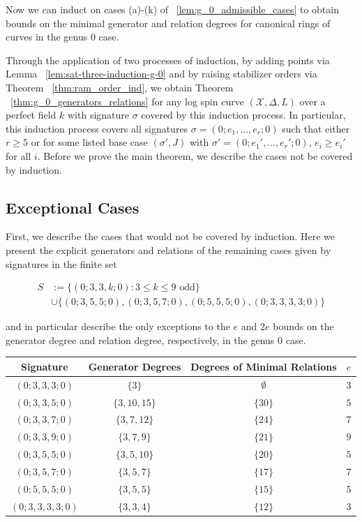 \documentclass{amsart}
\theoremstyle{plain}
\theoremstyle{definition}
\theoremstyle{remark}
\numberwithin{equation}{section}
\newcommand\ssec{\subsection}
\newcommand \sx{\mathscr X}
\begin{document}
Now we can induct on cases (a)-(k) of ~\ref{lem:g_0_admissible_cases}
to obtain bounds on the minimal generator and relation degrees for
canonical rings of curves in the genus 0 case.

Through the application of two processes of induction, by adding 
points via Lemma ~\ref{lem:sat-three-induction-g-0} and by raising
stabilizer orders via Theorem ~\ref{thm:ram_order_ind},
we obtain Theorem ~\ref{thm:g_0_generators_relations} for any
log spin curve $(\sx, \Delta, L)$ over a perfect field $k$ with
signature $\sigma$ covered by this induction process.
In particular, this induction process covers all signatures $\sigma
= (0; e_1, \ldots, e_r; 0)$ such that either $r \geq 5$ or
for some listed base case $(\sigma', J)$ with $\sigma' = (0; e_1',
\ldots, e_r'; 0)$, $e_i \geq e_i'$ for all $i$.
Before we prove the main theorem, we describe the cases not be
covered by induction.

\ssec{Exceptional Cases}
\label{ssec:g-0-exceptional}
First, we describe the cases that would not be covered by induction.
Here we present the explicit generators and relations of the remaining
cases given by signatures in the finite set

\begin{align*}
	S &:= \{(0; 3, 3, k; 0) : 3 \leq k \leq 9 \text{ odd}\} \\
		&\cup \{(0; 3, 5, 5; 0) ,(0; 3, 5, 7; 0), (0; 5, 5, 5; 0), (0; 3, 3, 3, 3; 0)\}
\end{align*}

\noindent
and in particular describe the only exceptions to the $e$ and $2e$
bounds on the generator degree and relation degree, respectively,
in the genus 0 case.

\begin{longtable}
	{| c || c | c | c |}
	\hline
	Signature & Generator Degrees & Degrees of Minimal Relations & $e$ \\
	\hline
	\hline

	$(0; 3, 3, 3; 0)$ & $\{3\}$ & $\emptyset$ & $3$ \\	\hline

	$(0; 3, 3, 5; 0)$ & $\{3, 10, 15\}$ & $\{30\}$ & $5$ \\	\hline
	
	$(0; 3, 3, 7; 0)$ & $\{3, 7, 12\}$ & $\{24\}$ & $7$ \\	\hline
	
	$(0; 3, 3, 9; 0)$ & $\{3, 7, 9\}$ & $\{21\}$ & $9$ \\	\hline
	
	$(0; 3, 5, 5; 0)$ & $\{3, 5, 10\}$ & $\{20\}$ & $5$ \\	\hline
	
	$(0; 3, 5, 7; 0)$ & $\{3, 5, 7\}$ & $\{17\}$ & $7$ \\	\hline
	
	$(0; 5, 5, 5; 0)$ & $\{3, 5, 5\}$ & $\{15\}$ & $5$ \\	\hline
	
	$(0; 3, 3, 3, 3; 0)$ & $\{3, 3, 4\}$ & $\{12\}$ & $3$ \\	\hline
\end{longtable}
\end{document}
